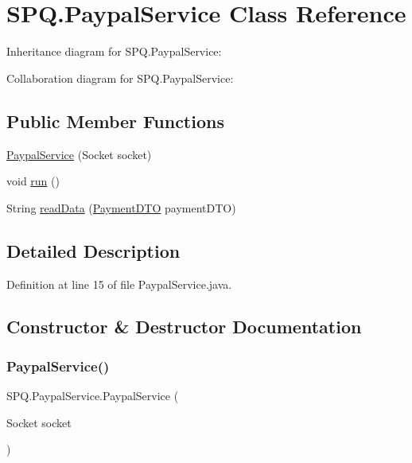 \hypertarget{class_s_p_q_1_1_paypal_service}{}\section{S\+P\+Q.\+Paypal\+Service Class Reference}
\label{class_s_p_q_1_1_paypal_service}


Inheritance diagram for S\+P\+Q.\+Paypal\+Service\+:


Collaboration diagram for S\+P\+Q.\+Paypal\+Service\+:
\subsection*{Public Member Functions}
\begin{DoxyCompactItemize}
\item 
\mbox{\hyperlink{class_s_p_q_1_1_paypal_service_a3cbaf105ed828689b48c82ec63527779}{Paypal\+Service}} (Socket socket)
\item 
void \mbox{\hyperlink{class_s_p_q_1_1_paypal_service_a05e65efee1bcfa26a215ea48b7c8696a}{run}} ()
\item 
String \mbox{\hyperlink{class_s_p_q_1_1_paypal_service_aae478af6069bf1ffa928b09f2a91328d}{read\+Data}} (\mbox{\hyperlink{class_s_p_q_1_1dto_1_1_payment_d_t_o}{Payment\+D\+TO}} payment\+D\+TO)
\end{DoxyCompactItemize}


\subsection{Detailed Description}


Definition at line 15 of file Paypal\+Service.\+java.



\subsection{Constructor \& Destructor Documentation}
\mbox{\label{class_s_p_q_1_1_paypal_service_a3cbaf105ed828689b48c82ec63527779}} 
\subsubsection{\texorpdfstring{Paypal\+Service()}{PaypalService()}}
{\footnotesize\ttfamily S\+P\+Q.\+Paypal\+Service.\+Paypal\+Service (\begin{DoxyParamCaption}\item[{Socket}]{socket }\end{DoxyParamCaption})}



